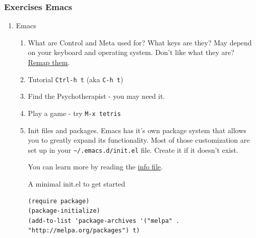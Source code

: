 \documentclass{article}
\begin{document}
\subsubsection{Exercises Emacs}
\label{sec:orgd90d5d8}
\begin{enumerate}
\item Emacs
\label{sec:org9cd6d26}
\begin{enumerate}
\item What are Control and Meta used for? What keys are they?
May depend on your keyboard and operating system. Don't like what they are? \href{https://www.x.org/releases/current/doc/man/man1/xmodmap.1.xhtml}{Remap them}.
\item Tutorial \texttt{Ctrl-h t} (aka \texttt{C-h t})
\item Find the Psychotherapist - you may need it.
\item Play a game - try \texttt{M-x tetris}
\item Init files and packages. 
Emacs has it's own package system that allows you to greatly expand its functionality. Most of those customization are set up in your \texttt{\textasciitilde{}/.emacs.d/init.el} file. Create it if it doesn't exist. 

You can learn more by reading the \href{emacs\#Init File}{info file}.

A minimal init.el to get started

\begin{verbatim}
(require package)
(package-initialize)
(add-to-list 'package-archives '("melpa" . "http://melpa.org/packages") t)
\end{verbatim}


\end{enumerate}
\end{enumerate}
\end{document}
